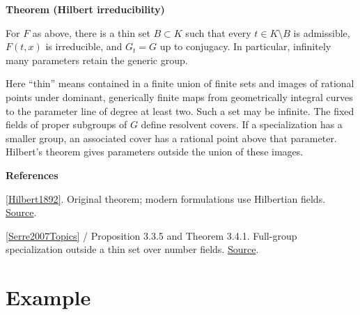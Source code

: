 \documentclass[11pt,a4paper,oneside,openany]{book}
\newenvironment{sources}{\par\smallskip\begingroup\footnotesize\color{atlasgray}\leftskip=10pt\setlength{\parskip}{2pt}}{\par\endgroup\smallskip}
\begin{document}
\begin{atlasblock}[standard]
\textbf{\sffamily Theorem (Hilbert irreducibility)}\par\smallskip
\color{black} For \(F\) as above, there is a thin set \(B\subset K\) such that every \(t\in K\setminus B\) is admissible, \(F(t,x)\) is irreducible, and \(G_t=G\) up to conjugacy. In particular, infinitely many parameters retain the generic group.\par
\end{atlasblock}\color{black}
\color{black} Here ``thin'' means contained in a finite union of finite sets and images of rational points under dominant, generically finite maps from geometrically integral curves to the parameter line of degree at least two. Such a set may be infinite. The fixed fields of proper subgroups of \(G\) define resolvent covers. If a specialization has a smaller group, an associated cover has a rational point above that parameter. Hilbert's theorem gives parameters outside the union of these images.\par
\begin{sources}
\textbf{References}\par\smallskip
\noindent\hyperlink{ref:Hilbert1892}{[Hilbert1892]}. Original theorem; modern formulations use Hilbertian fields. \href{https://www.degruyterbrill.com/document/doi/10.1515/crll.1892.110.104/html}{Source}.\par
\noindent\hyperlink{ref:Serre2007Topics}{[Serre2007Topics]} / Proposition 3.3.5 and Theorem 3.4.1. Full-group specialization outside a thin set over number fields. \href{https://www.routledge.com/Topics-in-Galois-Theory-2nd-Edition/Serre/p/book/9780429064401}{Source}.\par
\end{sources}\color{black}
\section{Example}
\end{document}
